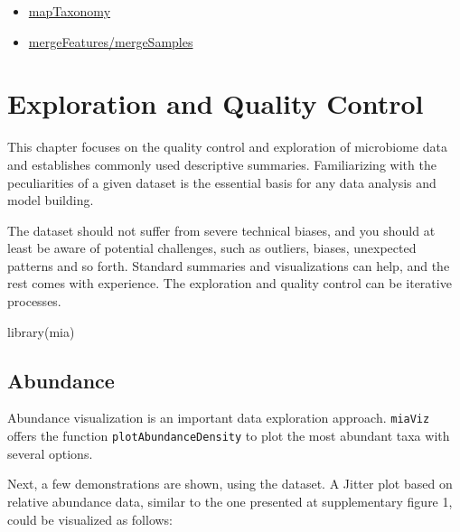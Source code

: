 \documentclass[
]{book}
\newenvironment{Shaded}{\begin{snugshade}}{\end{snugshade}}
\newcommand{\FunctionTok}[1]{\textcolor[rgb]{0.00,0.00,0.00}{#1}}
\newcommand{\NormalTok}[1]{#1}
\providecommand{\tightlist}{%
  \setlength{\itemsep}{0pt}\setlength{\parskip}{0pt}}
\begin{document}
\begin{itemize}
\tightlist
\item
  \href{https://microbiome.github.io/mia/reference/taxonomy-methods.html}{mapTaxonomy}
\item
  \href{https://microbiome.github.io/mia/reference/merge-methods.html}{mergeFeatures/mergeSamples}
\end{itemize}

\hypertarget{quality-control}{%
\chapter{Exploration and Quality Control}\label{quality-control}}

This chapter focuses on the quality control and exploration of
microbiome data and establishes commonly used descriptive
summaries. Familiarizing with the peculiarities of a given dataset is
the essential basis for any data analysis and model building.

The dataset should not suffer from severe technical biases, and you
should at least be aware of potential challenges, such as outliers,
biases, unexpected patterns and so forth. Standard summaries and
visualizations can help, and the rest comes with experience. The
exploration and quality control can be iterative processes.

\begin{Shaded}
\begin{Highlighting}[]
\FunctionTok{library}\NormalTok{(mia)}
\end{Highlighting}
\end{Shaded}

\hypertarget{abundance}{%
\section{Abundance}\label{abundance}}

Abundance visualization is an important data exploration
approach. \texttt{miaViz} offers the function \texttt{plotAbundanceDensity} to plot
the most abundant taxa with several options.

Next, a few demonstrations are shown, using the \citep{Lahti2014}
dataset. A Jitter plot based on relative abundance data, similar to
the one presented at \citep{Salosensaari2021} supplementary figure 1, could
be visualized as follows:
\end{document}
